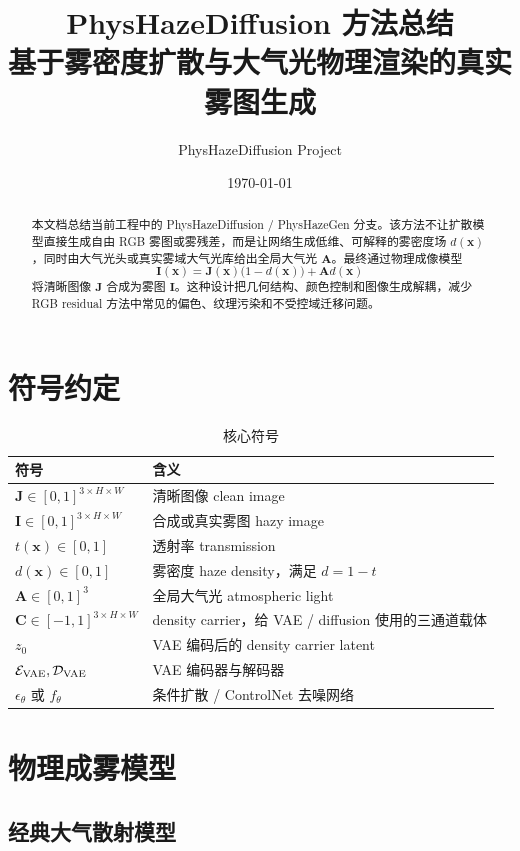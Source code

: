 \documentclass[11pt,a4paper]{ctexart}
\title{\textbf{PhysHazeDiffusion 方法总结}\\
\large 基于雾密度扩散与大气光物理渲染的真实雾图生成}
\author{PhysHazeDiffusion Project}
\date{\today}
\begin{document}
\maketitle

\begin{abstract}
本文档总结当前工程中的 PhysHazeDiffusion / PhysHazeGen 分支。该方法不让扩散模型直接生成自由 RGB 雾图或雾残差，而是让网络生成低维、可解释的雾密度场
$d(\bm{x})$，同时由大气光头或真实雾域大气光库给出全局大气光 $\bm{A}$。最终通过物理成像模型
\[
  \bm{I}(\bm{x}) = \bm{J}(\bm{x})\bigl(1-d(\bm{x})\bigr) + \bm{A}d(\bm{x})
\]
将清晰图像 $\bm{J}$ 合成为雾图 $\bm{I}$。这种设计把几何结构、颜色控制和图像生成解耦，减少 RGB residual 方法中常见的偏色、纹理污染和不受控域迁移问题。
\end{abstract}

\section{符号约定}

\begin{table}[h]
\centering
\caption{核心符号}
\begin{tabular}{ll}
\toprule
符号 & 含义 \\
\midrule
$\bm{J}\in[0,1]^{3\times H\times W}$ & 清晰图像 clean image \\
$\bm{I}\in[0,1]^{3\times H\times W}$ & 合成或真实雾图 hazy image \\
$t(\bm{x})\in[0,1]$ & 透射率 transmission \\
$d(\bm{x})\in[0,1]$ & 雾密度 haze density，满足 $d=1-t$ \\
$\bm{A}\in[0,1]^3$ & 全局大气光 atmospheric light \\
$\bm{C}\in[-1,1]^{3\times H\times W}$ & density carrier，给 VAE / diffusion 使用的三通道载体 \\
$z_0$ & VAE 编码后的 density carrier latent \\
$\mathcal{E}_{\rm VAE},\mathcal{D}_{\rm VAE}$ & VAE 编码器与解码器 \\
$\epsilon_\theta$ 或 $f_\theta$ & 条件扩散 / ControlNet 去噪网络 \\
\bottomrule
\end{tabular}
\end{table}

\section{物理成雾模型}

\subsection{经典大气散射模型}
\end{document}
